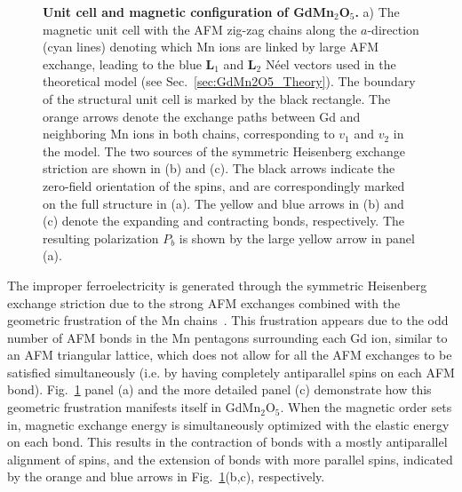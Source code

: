\begin{figure}
	\caption{\label{fig:GdMn2O5_unit_cell}{\bf Unit cell and magnetic configuration of GdMn$_2$O$_5$.} a) The magnetic unit cell with the AFM zig-zag chains along the $a$-direction (cyan lines) denoting which Mn ions are linked by large AFM exchange, leading to the blue $\bm{L}_1$ and $\bm{L}_2$ N\'eel vectors used in the theoretical model (see Sec.~\ref{sec:GdMn2O5_Theory}). The boundary of the structural unit cell is marked by the black rectangle. The orange arrows denote the exchange paths between Gd and neighboring Mn ions in both chains, corresponding to $v_1$ and $v_2$ in the model. The two sources of the symmetric Heisenberg exchange striction are shown in (b) and (c). The black arrows indicate the zero-field orientation of the spins, and are correspondingly marked on the full structure in (a). The yellow and blue arrows in (b) and (c) denote the expanding and contracting bonds, respectively. The resulting polarization $P_b$ is shown by the large yellow arrow in panel (a).}
\end{figure}
The improper ferroelectricity is generated through the symmetric Heisenberg exchange striction due to the strong AFM exchanges combined with the geometric frustration of the Mn chains~\cite{Choi2008}.
This frustration appears due to the odd number of AFM bonds in the Mn pentagons surrounding each Gd ion, similar to an AFM triangular lattice, which does not allow for all the AFM exchanges to be satisfied simultaneously (i.e. by having completely antiparallel spins on each AFM bond).
Fig.~\ref{fig:GdMn2O5_unit_cell} panel (a) and the more detailed panel (c) demonstrate how this geometric frustration manifests itself in GdMn$_2$O$_5$.
When the magnetic order sets in, magnetic exchange energy is simultaneously optimized with the elastic energy on each bond.
This results in the contraction of bonds with a mostly antiparallel alignment of spins, and the extension of bonds with more parallel spins, indicated by the orange and blue arrows in Fig.~\ref{fig:GdMn2O5_unit_cell}(b,c), respectively.

